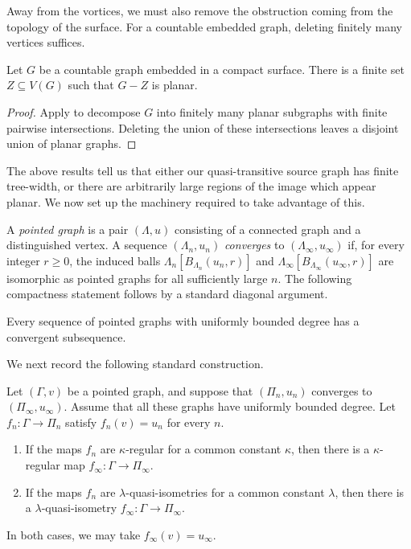 \documentclass[a4paper]{amsart}
\begin{document}
Away from the vortices, we must also remove the obstruction coming from the topology of the surface.
For a countable embedded graph, deleting finitely many vertices suffices.

\begin{lemma}\label{lem:finite-planarising-set}
Let $G$ be a countable graph embedded in a compact surface.
There is a finite set $Z\subseteq V(G)$ such that $G-Z$ is planar.
\end{lemma}

\begin{proof}
Apply \cite[Thm.~1.2]{georgakopoulos2025excluded} to decompose $G$ into finitely many planar subgraphs with finite pairwise intersections.
Deleting the union of these intersections leaves a disjoint union of planar graphs.
\end{proof}


The above results tell us that either our quasi-transitive source graph has finite tree-width, or there are arbitrarily large regions of the image which appear planar. We now  set up the machinery required to take advantage of this. 

A \emph{pointed graph} is a pair $(\Lambda,u)$ consisting of a connected graph and a distinguished vertex.
A sequence $(\Lambda_n,u_n)$ \emph{converges} to $(\Lambda_\infty,u_\infty)$ if, for every integer $r\geq0$, the induced balls $\Lambda_n[B_{\Lambda_n}(u_n,r)]$ and $\Lambda_\infty[B_{\Lambda_\infty}(u_\infty,r)]$ are isomorphic as pointed graphs for all sufficiently large $n$.
The following compactness statement follows by a standard diagonal argument. 

\begin{proposition}\label{prop:pointed-compactness}
Every sequence of pointed graphs with uniformly bounded degree has a convergent subsequence. 
\end{proposition}



We next record the following standard construction.

\begin{proposition}\label{prop:pointed-limits-maps}
Let $(\Gamma,v)$ be a pointed graph, and suppose that $(\Pi_n,u_n)$ converges to $(\Pi_\infty,u_\infty)$. Assume that all these graphs have uniformly bounded degree. Let $f_n:\Gamma\to\Pi_n$ satisfy $f_n(v)=u_n$ for every $n$.
\begin{enumerate}
\item If the maps $f_n$ are $\kappa$-regular for a common constant $\kappa$, then there is a $\kappa$-regular map $f_\infty:\Gamma\to\Pi_\infty$.
\item If the maps $f_n$ are $\lambda$-quasi-isometries for a common constant $\lambda$, then there is a $\lambda$-quasi-isometry $f_\infty:\Gamma\to\Pi_\infty$.
\end{enumerate}
In both cases, we may take $f_\infty(v)=u_\infty$.
\end{proposition}
\end{document}
